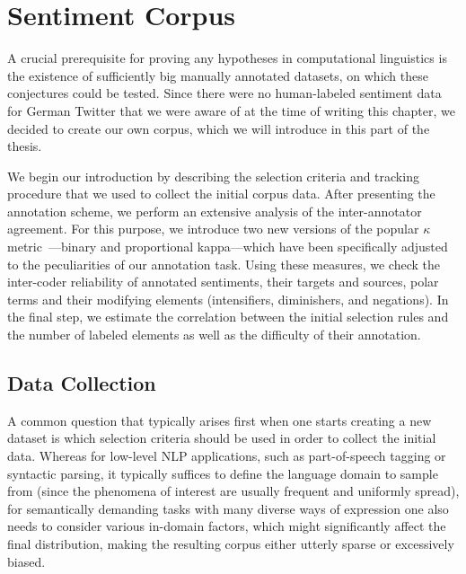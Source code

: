

\chapter{Sentiment Corpus}\label{chap:corpus}

A crucial prerequisite for proving any hypotheses in computational
linguistics is the existence of sufficiently big manually annotated
datasets, on which these conjectures could be tested.  Since there
were no human-labeled sentiment data for German Twitter that we were
aware of at the time of writing this chapter, we decided to create our
own corpus, which we will introduce in this part of the thesis.

We begin our introduction by describing the selection criteria and
tracking procedure that we used to collect the initial corpus data.
After presenting the annotation scheme, we perform an extensive
analysis of the inter-annotator agreement.  For this purpose, we
introduce two new versions of the popular $\kappa$
metric~\cite{Cohen:60}---binary and proportional kappa---which have
been specifically adjusted to the peculiarities of our annotation
task.  Using these measures, we check the inter-coder reliability of
annotated sentiments, their targets and sources, polar terms and their
modifying elements (intensifiers, diminishers, and negations).  In the
final step, we estimate the correlation between the initial selection
rules and the number of labeled elements as well as the difficulty of
their annotation.

\section{Data Collection}

A common question that typically arises first when one starts creating
a new dataset is which selection criteria should be used in order to
collect the initial data.  Whereas for low-level NLP applications,
such as part-of-speech tagging or syntactic parsing, it typically
suffices to define the language domain to sample from (since the
phenomena of interest are usually frequent and uniformly spread), for
semantically demanding tasks with many diverse ways of expression one
also needs to consider various in-domain factors, which might
significantly affect the final distribution, making the resulting
corpus either utterly sparse or excessively biased.

